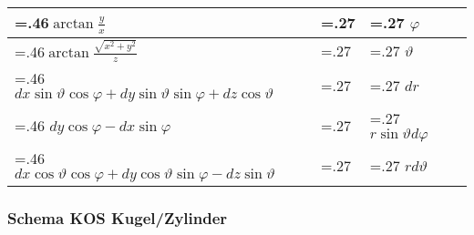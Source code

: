 \begin{tabularx}{0.45\textwidth}{>{\hsize=.46\hsize}X|>{\hsize=.27\hsize}X|>{\hsize=.27\hsize}X}
	\hline
	$\arctan \frac{y}{x}$                                                                &                  & $\varphi$                       \\
	\hline
	$\arctan \frac{\sqrt{x^{2}+y^{2}}}{z}$                                               &                  & $\vartheta$                     \\
	\hline
	$d x \sin \vartheta \cos \varphi+d y \sin \vartheta \sin \varphi+d z \cos \vartheta$ &                  & $dr$                            \\
	\hline
	$d y \cos \varphi-d x \sin \varphi$                                                  &                  & $r \sin \vartheta d \varphi$    \\
	\hline
	$d x \cos \vartheta \cos \varphi+d y \cos \vartheta \sin \varphi-d z \sin \vartheta$ &                  & $r d \vartheta$                 \\
\end{tabularx}

\subsubsection{Schema KOS Kugel/Zylinder}

